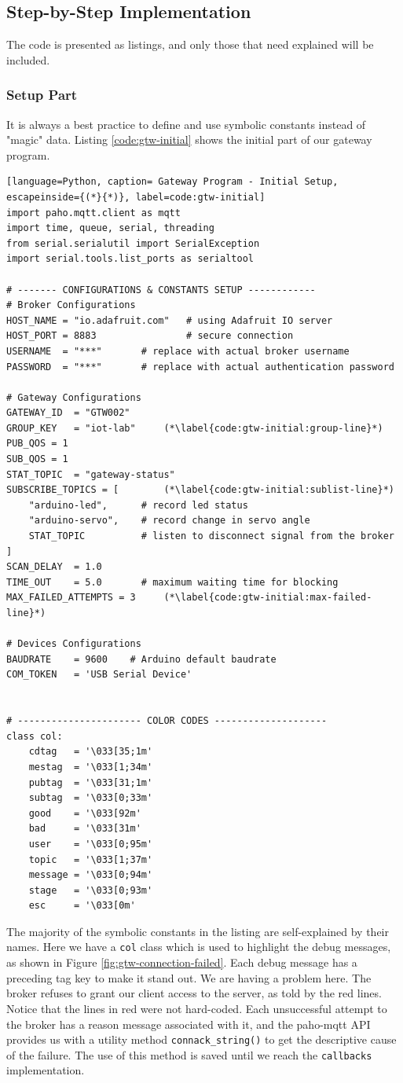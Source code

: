 \subsection{Step-by-Step Implementation}
The code is presented as listings, and only those that need explained will be included.
\subsubsection{Setup Part}
It is always a best practice to define and use symbolic constants instead of "magic" data. Listing \ref{code:gtw-initial} shows the initial part of our gateway program.
\begin{lstlisting}[language=Python, caption= Gateway Program - Initial Setup, escapeinside={(*}{*)}, label=code:gtw-initial]
import paho.mqtt.client as mqtt
import time, queue, serial, threading
from serial.serialutil import SerialException
import serial.tools.list_ports as serialtool

# ------- CONFIGURATIONS & CONSTANTS SETUP ------------
# Broker Configurations
HOST_NAME = "io.adafruit.com"   # using Adafruit IO server
HOST_PORT = 8883                # secure connection
USERNAME  = "***"       # replace with actual broker username 
PASSWORD  = "***"       # replace with actual authentication password

# Gateway Configurations
GATEWAY_ID  = "GTW002"
GROUP_KEY   = "iot-lab"     (*\label{code:gtw-initial:group-line}*)
PUB_QOS = 1
SUB_QOS = 1
STAT_TOPIC  = "gateway-status"
SUBSCRIBE_TOPICS = [        (*\label{code:gtw-initial:sublist-line}*)
    "arduino-led",      # record led status
    "arduino-servo",    # record change in servo angle
    STAT_TOPIC          # listen to disconnect signal from the broker
]
SCAN_DELAY  = 1.0
TIME_OUT    = 5.0       # maximum waiting time for blocking
MAX_FAILED_ATTEMPTS = 3     (*\label{code:gtw-initial:max-failed-line}*)

# Devices Configurations
BAUDRATE    = 9600    # Arduino default baudrate
COM_TOKEN   = 'USB Serial Device'


# ---------------------- COLOR CODES --------------------
class col:
    cdtag   = '\033[35;1m'
    mestag  = '\033[1;34m'
    pubtag  = '\033[31;1m'
    subtag  = '\033[0;33m'
    good    = '\033[92m'
    bad     = '\033[31m'
    user    = '\033[0;95m'
    topic   = '\033[1;37m'
    message = '\033[0;94m'
    stage   = '\033[0;93m'
    esc     = '\033[0m'
\end{lstlisting}
The majority of the symbolic constants in the listing are self-explained by their names. Here we have a \texttt{col} class which is used to highlight the debug messages, as shown in Figure \ref{fig:gtw-connection-failed}. Each debug message has a preceding tag key to make it stand out. We are having a problem here. The broker refuses to grant our client access to the server, as told by the red lines. Notice that the lines in red were not hard-coded. Each unsuccessful attempt to the broker has a reason message associated with it, and the paho-mqtt API provides us with a utility method \texttt{connack\_string()} to get the descriptive cause of the failure. The use of this method is saved until we reach the \texttt{callbacks} implementation.

